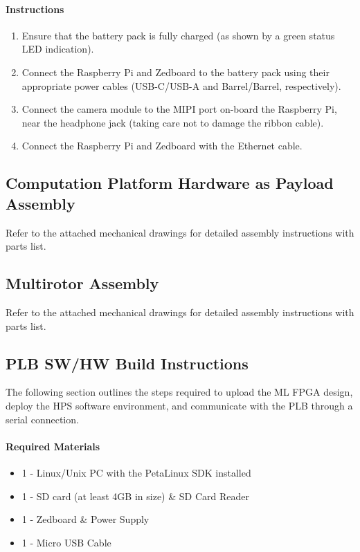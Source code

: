 \documentclass[10pt,letterpaper]{article}
\begin{document}
\paragraph{Instructions}
\begin{enumerate}
\item Ensure that the battery pack is fully charged (as shown by a green status LED indication).
\item Connect the Raspberry Pi and Zedboard to the battery pack using their appropriate power cables (USB-C/USB-A and Barrel/Barrel, respectively).
\item Connect the camera module to the MIPI port on-board the Raspberry Pi, near the headphone jack (taking care not to damage the ribbon cable).
\item Connect the Raspberry Pi and Zedboard with the Ethernet cable.
\end{enumerate}

\subsection{Computation Platform Hardware as Payload Assembly}
Refer to the attached mechanical drawings for detailed assembly instructions with parts list.

\subsection{Multirotor Assembly}
Refer to the attached mechanical drawings for detailed assembly instructions with parts list.

\subsection{PLB SW/HW Build Instructions}
\label{plb_setup}
The following section outlines the steps required to upload the ML FPGA design, deploy the HPS software environment, and communicate with the PLB through a serial connection.

\paragraph{Required Materials}
\begin{itemize}
\item 1 - Linux/Unix PC with the PetaLinux SDK\cite{petalinux} installed
\item 1 - SD card (at least 4GB in size) \& SD Card Reader
\item 1 - Zedboard \& Power Supply
\item 1 - Micro USB Cable
\end{itemize}
\end{document}
